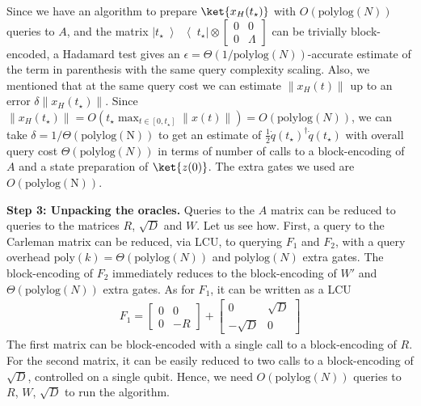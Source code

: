 \documentclass[superscriptaddress,onecolumn,nofootinbib,longbibliography,a4paper,accepted=2026-09-29]{quantumarticle}
\theoremstyle{plain}
\theoremstyle{definition}
\numberwithin{thm}{section}
\numberwithin{assumption}{section}
\numberwithin{lemma}{section}
\numberwithin{prop}{section}
\numberwithin{cor}{section}
\numberwithin{definition}{section}
\numberwithin{rmk}{section}
\numberwithin{equation}{section}
\newcommand{\ketbra}[2]   {\left|#1\middle\rangle\!\middle\langle#2\right|}
\begin{document}
Since we have an algorithm to prepare $\ket{x_H(t_\star)}$ with $O(\mathrm{polylog}(N))$ queries to $A$, and the matrix $\ketbra{t_\star}{t_\star} \otimes  \begin{bmatrix} 0 & 0 \\ 0 & \Lambda \end{bmatrix}$ can be trivially block-encoded, a Hadamard test gives an $\epsilon = \Theta(1/\mathrm{polylog}(N))$-accurate estimate of the term in parenthesis with the same query complexity scaling. Also, we mentioned that at the same query cost we can estimate $\|x_H(t)\|$ up to an error $\delta \| x_H(t_\star)\|$. Since $\|x_H(t_\star)\| = O( t_\star \max_{t \in [0,t_\star]} \|x(t)\|) = O(\mathrm{polylog}(N))$, we can take $\delta = 1/\Theta(\mathrm{polylog(N)})$ to get an estimate of $\frac{1}{2} \dot{q}(t_\star)^\dag \dot{q}(t_\star)$ with overall query cost $\Theta(\mathrm{polylog}(N))$ in terms of number of calls to a block-encoding of $A$ and a state preparation of $\ket{z(0)}$. The extra gates we used are $O(\mathrm{polylog(N)})$. 

\bigskip

\textbf{Step 3: Unpacking the oracles.} Queries to the $A$ matrix can be reduced to queries to the matrices $R$, $\sqrt{D}$ and $W$. Let us see how. First, a query to the Carleman matrix can be reduced, via LCU, to querying $F_1$ and $F_2$, with a query overhead $\mathrm{poly}(k) = \Theta(\mathrm{polylog}(N))$ and $\mathrm{polylog}(N)$ extra gates. The block-encoding of $F_2$ immediately reduces to the block-encoding of $W'$ and $\Theta(\mathrm{polylog}(N))$ extra gates. As for $F_1$, it can be written as a LCU
\begin{align}
   F_1 = \begin{bmatrix}
        0 & 0 \\  0 & -R
    \end{bmatrix} + \begin{bmatrix}
        0 & \sqrt{D} \\  - \sqrt{D} & 0
    \end{bmatrix}
\end{align}
The first matrix can be block-encoded with a single call to a block-encoding of $R$. For the second matrix, it can be easily reduced to two calls to a block-encoding of $\sqrt{D}$, controlled on a single qubit. Hence, we need $O(\mathrm{polylog}(N))$ queries to $R$, $W$, $\sqrt{D}$ to run the algorithm.
\end{document}
